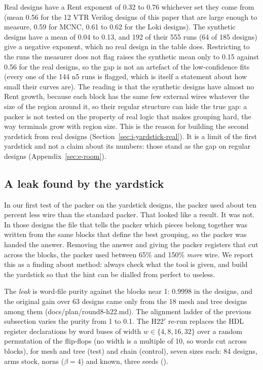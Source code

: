  Real designs have a Rent exponent of 0.32 to 0.76 whichever set they come from (mean 0.56 for the 12 VTR Verilog designs of this paper that are large enough to measure, 0.59 for MCNC, 0.61 to 0.62 for the Loki designs). The synthetic designs have a mean of 0.04 to 0.13, and 192 of their 555 runs (64 of 185 designs) give a negative exponent, which no real design in the table does. Restricting to the runs the measurer does not flag raises the synthetic mean only to 0.15 against 0.56 for the real designs, so the gap is not an artefact of the low-confidence fits (every one of the 144 n5 runs is flagged, which is itself a statement about how small their curves are). The reading is that the synthetic designs have almost no Rent growth, because each block has the same few external wires whatever the size of the region around it, so their regular structure can hide the true gap: a packer is not tested on the property of real logic that makes grouping hard, the way terminals grow with region size. This is the reason for building the second yardstick from real designs (Section~\ref{sec:i-yardstick-real}). It is a limit of the first yardstick and not a claim about its numbers: those stand as the gap on regular designs (Appendix~\ref{sec:e-room}).

\subsection{A leak found by the yardstick}
\label{sec:i-leak}

 In our first test of the packer on the yardstick designs, the packer used about ten percent less wire than the standard packer. That looked like a result. It was not. In those designs the file that tells the packer which pieces belong together was written from the same blocks that define the best grouping, so the packer was handed the answer. Removing the answer and giving the packer registers that cut across the blocks, the packer used between 65\% and 150\% \emph{more} wire. We report this as a finding about method: always check what the tool is given, and build the yardstick so that the hint can be dialled from perfect to useless.

 The \emph{leak} is word-file purity against the blocks near 1: 0.9998 in the  designs, and the original gain over 63 designs came only from the 18 mesh and tree  designs among them (docs/plan/round8-h22.md). The alignment ladder of the previous subsection varies the purity from 1 to 0.1. The H22$'$ re-run replaces the HDL register declarations by word buses of width $w\in\{4,8,16,32\}$ over a random permutation of the flip-flops (no width is a multiple of 10, so words cut across blocks), for mesh and tree (test) and chain (control), seven sizes each: 84 designs, arms stock, norns ($\beta=4$) and known, three seeds ().

